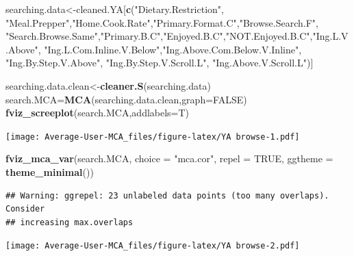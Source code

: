 \documentclass[
]{article}
\newenvironment{Shaded}{\begin{snugshade}}{\end{snugshade}}
\newcommand{\DataTypeTok}[1]{\textcolor[rgb]{0.13,0.29,0.53}{#1}}
\newcommand{\KeywordTok}[1]{\textcolor[rgb]{0.13,0.29,0.53}{\textbf{#1}}}
\newcommand{\NormalTok}[1]{#1}
\newcommand{\OtherTok}[1]{\textcolor[rgb]{0.56,0.35,0.01}{#1}}
\newcommand{\StringTok}[1]{\textcolor[rgb]{0.31,0.60,0.02}{#1}}
\begin{document}
\begin{Shaded}
\begin{Highlighting}[]
\NormalTok{searching.data<-cleaned.YA[}\KeywordTok{c}\NormalTok{(}\StringTok{"Dietary.Restriction"}\NormalTok{, }\StringTok{"Meal.Prepper"}\NormalTok{,}\StringTok{"Home.Cook.Rate"}\NormalTok{,}\StringTok{"Primary.Format.C"}\NormalTok{,}\StringTok{"Browse.Search.F"}\NormalTok{,}
            \StringTok{"Search.Browse.Same"}\NormalTok{,}\StringTok{"Primary.B.C"}\NormalTok{,}\StringTok{"Enjoyed.B.C"}\NormalTok{,}\StringTok{"NOT.Enjoyed.B.C"}\NormalTok{,}\StringTok{"Ing.L.V.Above"}\NormalTok{,}
            \StringTok{"Ing.L.Com.Inline.V.Below"}\NormalTok{,}\StringTok{"Ing.Above.Com.Below.V.Inline"}\NormalTok{,  }\StringTok{"Ing.By.Step.V.Above"}\NormalTok{,  }\StringTok{"Ing.By.Step.V.Scroll.L"}\NormalTok{,}
            \StringTok{"Ing.Above.V.Scroll.L"}\NormalTok{)]}

\NormalTok{searching.data.clean<-}\KeywordTok{cleaner.S}\NormalTok{(searching.data)}
\NormalTok{search.MCA=}\KeywordTok{MCA}\NormalTok{(searching.data.clean,}\DataTypeTok{graph=}\OtherTok{FALSE}\NormalTok{)}
\KeywordTok{fviz_screeplot}\NormalTok{(search.MCA,}\DataTypeTok{addlabels=}\NormalTok{T)}
\end{Highlighting}
\end{Shaded}

\texttt{[image: Average-User-MCA\_files/figure-latex/YA browse-1.pdf]}

\begin{Shaded}
\begin{Highlighting}[]
\KeywordTok{fviz_mca_var}\NormalTok{(search.MCA, }\DataTypeTok{choice =} \StringTok{"mca.cor"}\NormalTok{, }\DataTypeTok{repel =} \OtherTok{TRUE}\NormalTok{,}
             \DataTypeTok{ggtheme =} \KeywordTok{theme_minimal}\NormalTok{())}
\end{Highlighting}
\end{Shaded}

\begin{verbatim}
## Warning: ggrepel: 23 unlabeled data points (too many overlaps). Consider
## increasing max.overlaps
\end{verbatim}

\texttt{[image: Average-User-MCA\_files/figure-latex/YA browse-2.pdf]}

\begin{Shaded}
\end{Shaded}
\end{document}
